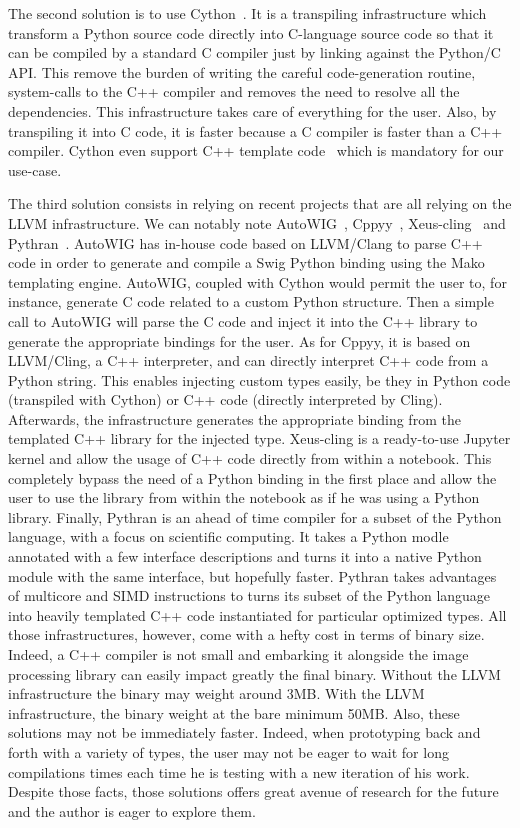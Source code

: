 The second solution is to use Cython~\parencite{behnel.2010.cython}. It is a transpiling infrastructure which transform
a Python source code directly into C-language source code so that it can be compiled by a standard C compiler just by
linking against the Python/C API. This remove the burden of writing the careful code-generation routine, system-calls to
the C++ compiler and removes the need to resolve all the dependencies. This infrastructure takes care of everything for
the user. Also, by transpiling it into C code, it is faster because a C compiler is faster than a C++ compiler. Cython
even support C++ template code~\parencite{behnel.2022.cython-template} which is mandatory for our use-case.

The third solution consists in relying on recent projects that are all relying on the LLVM infrastructure. We can
notably note AutoWIG~\parencite{fernique.2018.autowig}, Cppyy~\parencite{wimtlplavrijsen.2016.cppyy},
Xeus-cling~\parencite{quantstack.2021.xeus-cling} and Pythran~\parencite{guelton.2015.pythran}. AutoWIG has in-house
code based on LLVM/Clang to parse C++ code in order to generate and compile a Swig Python binding using the Mako
templating engine. AutoWIG, coupled with Cython would permit the user to, for instance, generate C code related to a
custom Python structure. Then a simple call to AutoWIG will parse the C code and inject it into the C++ library to
generate the appropriate bindings for the user. As for Cppyy, it is based on LLVM/Cling, a C++ interpreter, and can
directly interpret C++ code from a Python string. This enables injecting custom types easily, be they in Python code
(transpiled with Cython) or C++ code (directly interpreted by Cling). Afterwards, the infrastructure generates the
appropriate binding from the templated C++ library for the injected type. Xeus-cling is a ready-to-use Jupyter kernel
and allow the usage of C++ code directly from within a notebook. This completely bypass the need of a Python binding in
the first place and allow the user to use the library from within the notebook as if he was using a Python library.
Finally, Pythran is an ahead of time compiler for a subset of the Python language, with a focus on scientific computing.
It takes a Python modle annotated with a few interface descriptions and turns it into a native Python module with the
same interface, but hopefully faster. Pythran takes advantages of multicore and SIMD instructions to turns its subset of
the Python language into heavily templated C++ code instantiated for particular optimized types. All those
infrastructures, however, come with a hefty cost in terms of binary size. Indeed, a C++ compiler is not small and
embarking it alongside the image processing library can easily impact greatly the final binary. Without the LLVM
infrastructure the binary may weight around 3MB. With the LLVM infrastructure, the binary weight at the bare minimum
50MB. Also, these solutions may not be immediately faster. Indeed, when prototyping back and forth with a variety of
types, the user may not be eager to wait for long compilations times each time he is testing with a new iteration of his
work. Despite those facts, those solutions offers great avenue of research for the future and the author is eager to
explore them.


